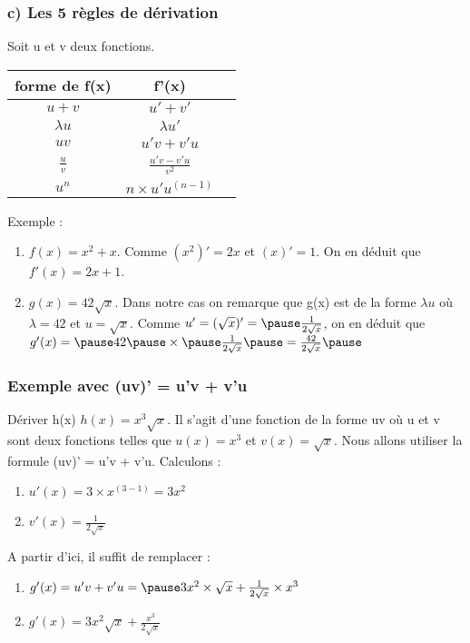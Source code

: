 \documentclass[t]{beamer}
\begin{document}
	\begin{frame}[label=pagebanale]
		\frametitle{c) Les 5 règles de dérivation}
		\pause
		Soit u et v deux fonctions.
		\begin{tabular}{|c|c|c|}
			\hline
				\textbf{forme de f(x)} & \textbf{f'(x)} \\
			\hline
				$u+v$ & $u' + v'$ \\
			\hline
				$\lambda u$ & $\lambda u'$ \\
			\hline
				$uv $ & $u'v +v'u$ \\
			\hline 
				$\frac{u}{v}$ & $\frac{u'v-v'u}{v^2}$ \\
			\hline
				$u^n$ & $n \times u' u^{(n-1)}$ \\
			\hline
		\end{tabular}
		\begin{block}{Exemple :}
			\begin{enumerate}
				\item<+-> $f(x) = x^2 + x$. \pause Comme $(x^2)' = 2x$ \pause et $(x)' = 1$. \pause On en déduit que $f'(x) = 2x + 1$. \pause
				\item<+-> $g(x) = 42 \sqrt{x}$. \pause Dans notre cas on remarque que g(x) est de la forme $\lambda u$ \pause où $\lambda = 42$ \pause et $u = \sqrt{x}$. \pause Comme $u' = (\sqrt{x})' = \pause \frac{1}{2\sqrt{x}}$, \pause on en déduit que $g'(x) = \pause 42 \pause \times \pause \frac{1}{2\sqrt{x}} \pause = \frac{42}{2\sqrt{x}} \pause $
			\end{enumerate}
		\end{block}
	\end{frame}

	\begin{frame}
		\frametitle{Exemple avec (uv)' = u'v + v'u}
		\pause
		\begin{block}{Dériver h(x)}
			$h(x) = x^3 \sqrt{x}$. \pause Il s'agit d'une fonction de la forme uv \pause où u et v sont deux fonctions \pause telles que $u(x) = x^3$ \pause et $v(x) = \sqrt{x}$. \pause Nous allons utiliser la formule (uv)' = u'v + v'u. \pause Calculons :
			\begin{enumerate}{}
				\item<+-> \(u'(x)= 3 \times x^{(3-1)} = 3x^2 \)
				\item<+-> \(v'(x) = \frac{1}{2 \sqrt{x}} \) 
			\end{enumerate}
			\pause
			A partir d'ici, il suffit de remplacer : \pause
			\begin{enumerate}[]
				\item<+-> \(g'(x) = u'v + v'u = \pause 3x^2 \times \sqrt{x} + \frac{1}{2 \sqrt{x}} \times x^3\) \pause
				\item<+-> \(g'(x) = 3x^2 \sqrt{x} + \frac{x^3}{2 \sqrt{x}} \)
			\end{enumerate}	
		\end{block}
	\end{frame}
\end{document}
